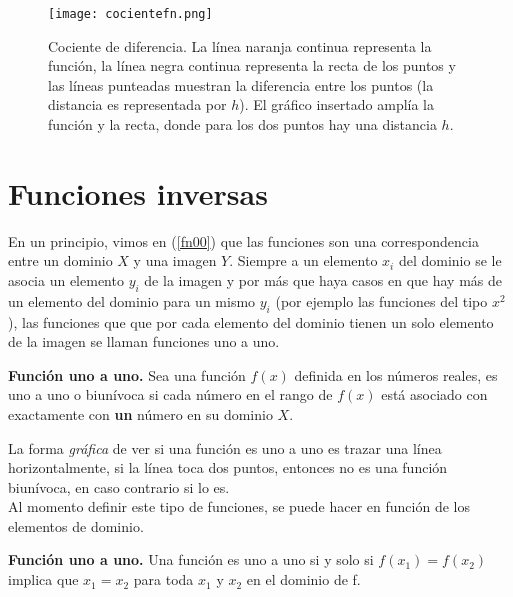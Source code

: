 \begin{center}
\begin{figure}[h!]
\centering
\texttt{[image: cocientefn.png]}
\caption[Cociente de diferencia.]{Cociente de diferencia. La línea naranja continua representa la función, la línea negra continua representa la recta de los puntos y las líneas punteadas muestran la diferencia entre los puntos (la distancia es representada por $h$). El gráfico insertado amplía la función y la recta, donde para los dos puntos hay una distancia $h$.} \label{cocifn}
\end{figure}
\end{center}

\section{Funciones inversas}
En un principio, vimos en (\ref{fn00}) que las funciones son una correspondencia entre un dominio $X$ y una imagen $Y$. Siempre a un elemento $x_{i}$ del dominio se le asocia un elemento $y_{i}$ de la imagen y por más que haya casos en que hay más de un elemento del dominio para un mismo $y_{i}$ (por ejemplo las funciones del tipo $x^{2}$), las funciones que que por cada elemento del dominio tienen un solo elemento de la imagen se llaman funciones uno a uno.

\begin{mydef}
\textbf{Función uno a uno.} Sea una función $f(x)$ definida en los números reales, es uno a uno o biunívoca si cada número en el rango de $f(x)$ está asociado con exactamente con \textbf{un} número en su dominio $X$.  
\end{mydef}

La forma \textit{gráfica} de ver si una función es uno a uno es trazar una línea horizontalmente, si la línea toca dos puntos, entonces no es una función biunívoca, en caso contrario si lo es.\\
Al momento definir este tipo de funciones, se puede hacer en función de los elementos de dominio.

\begin{mydef}
\textbf{Función uno a uno.} Una función es uno a uno si y solo si $f(x_{1})=f(x_{2})$ implica que $x_{1}=x_{2}$ para toda $x_{1}$ y $x_{2}$ en el dominio de f.
\end{mydef}


